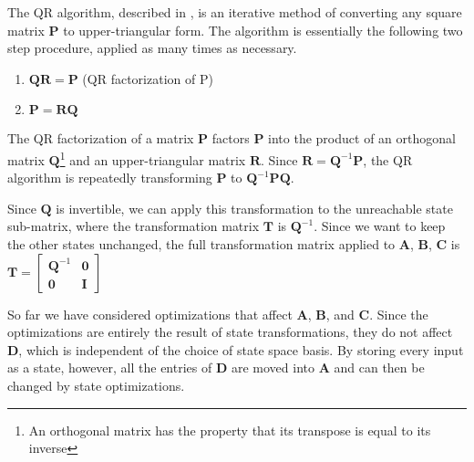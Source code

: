     The QR algorithm, described in \cite{Trefethen}, is an iterative method of
converting any square matrix $\mathbf{P}$ to upper-triangular
form. The algorithm is essentially the following two step
procedure, applied as many times as necessary.
\begin{enumerate}
\vspace{\itemshrink} \item $\mathbf{Q} \mathbf{R} = \mathbf{P}$   (QR factorization of
P)

\vspace{\itemshrink} \item $\mathbf{P} = \mathbf{R} \mathbf{Q}$
\vspace{\itemshrink} \end{enumerate}

    The QR factorization of a matrix $\mathbf{P}$ factors
$\mathbf{P}$ into the product of an orthogonal matrix
$\mathbf{Q}$\footnote{An orthogonal matrix has the property that
its transpose is equal to its inverse} and an upper-triangular
matrix $\mathbf{R}$. Since $\mathbf{R} = \mathbf{Q}^{-1}
\mathbf{P}$, the QR algorithm is repeatedly transforming
$\mathbf{P}$ to $\mathbf{Q}^{-1} \mathbf{P} \mathbf{Q}$.

    Since $\mathbf{Q}$ is invertible, we can apply this
transformation to the unreachable state sub-matrix, where the
transformation matrix $\mathbf{T}$ is $\mathbf{Q}^{-1}$. Since we
want to keep the other states unchanged, the full transformation
matrix applied to $\mathbf{A}$, $\mathbf{B}$, $\mathbf{C}$ is
$\mathbf{T} = \left [ \begin{array} {cc} \mathbf{Q}^{-1} &
\mathbf{0} \\ \mathbf{0} & \mathbf{I} \end{array} \right ]$


    So far we have considered optimizations that affect $\mathbf{A}$,
$\mathbf{B}$, and $\mathbf{C}$. Since the optimizations are
entirely the result of state transformations, they do not affect
$\mathbf{D}$, which is independent of the choice of state space
basis. By storing every input as a state, however, all the entries
of $\mathbf{D}$ are moved into $\mathbf{A}$ and can then be
changed by state optimizations.

